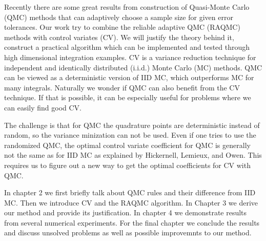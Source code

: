 

Recently there are some great results from construction of Quasi-Monte Carlo (QMC) methods that can adaptively choose a sample size for given error tolerances\cite{hickernell2014reliable}.   
Our work try to combine the reliable adaptive QMC (RAQMC) methods with control variates (CV). We will justify the theory behind it, construct a practical algorithm which can be implemented and tested through high dimensional integration examples.
CV is a variance reduction technique for independent and identically distributed (i.i.d.) Monte Carlo (MC) methods.
QMC can be viewed as a deterministic version of IID MC, which outperforms MC for many integrals\cite{avramidis1996integrated}. 
Naturally we wonder if QMC can also benefit from the CV technique. If that is possible, it can be especially useful for problems where we can easily find good CV.


The challenge is that for QMC the quadrature points are deterministic instead of random, so the variance minization can not be used. 
Even if one tries to use the randomized QMC, the optimal control variate coefficient for QMC is generally not the same as for IID MC as explained by Hickernell, Lemieux, and Owen\cite{hickernell2005control}. 
This requires us to figure out a new way to get the optimal coefficients for CV with QMC.


In chapter 2 we first briefly talk about QMC rules and their difference from IID MC. 
Then we introduce CV and the RAQMC algorithm. 
In Chapter 3 we derive our method and provide its justification.
In chapter 4 we demonstrate results from several numerical experiments. For the final chapter we conclude the results and discuss unsolved problems as well as possible improvemnts to our method.

